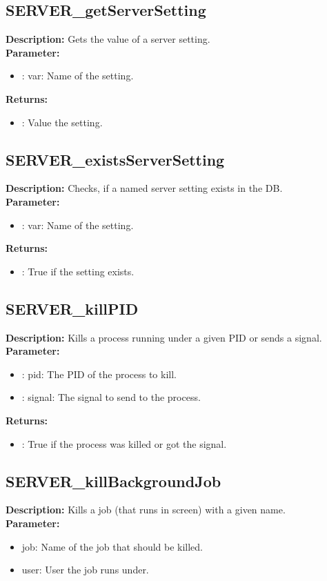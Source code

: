 \subsection{SERVER\_getServerSetting}
\textbf{Description:} Gets the value of a server setting.\\
\textbf{Parameter:}
\begin{itemize}
\item : var: Name of the setting.
\end{itemize}
\textbf{Returns:}
\begin{itemize}
\item : Value the setting.
\end{itemize}

\subsection{SERVER\_existsServerSetting}
\textbf{Description:} Checks, if a named server setting exists in the DB.\\
\textbf{Parameter:}
\begin{itemize}
\item : var: Name of the setting.
\end{itemize}
\textbf{Returns:}
\begin{itemize}
\item : True if the setting exists.
\end{itemize}

\subsection{SERVER\_killPID}
\textbf{Description:} Kills a process running under a given PID or sends a signal.\\
\textbf{Parameter:}
\begin{itemize}
\item : pid: The PID of the process to kill.
\item : signal: The signal to send to the process.
\end{itemize}
\textbf{Returns:}
\begin{itemize}
\item : True if the process was killed or got the signal.
\end{itemize}

\subsection{SERVER\_killBackgroundJob}
\textbf{Description:} Kills a job (that runs in screen) with a given name.\\
\textbf{Parameter:}
\begin{itemize}
\item job: Name of the job that should be killed.
\item user: User the job runs under.
\end{itemize}

